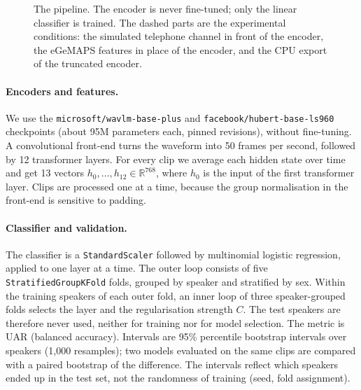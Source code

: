 \documentclass[11pt,a4paper]{article}
\begin{document}
\begin{figure}[t]
\caption{The pipeline. The encoder is never fine-tuned; only the linear classifier is trained.
The dashed parts are the experimental conditions: the simulated telephone channel in front of
the encoder, the eGeMAPS features in place of the encoder, and the CPU export of the truncated
encoder.}
\label{fig:pipeline}
\end{figure}

\paragraph{Encoders and features.} We use the \texttt{microsoft/wavlm-base-plus} and
\texttt{facebook/hubert-base-ls960} checkpoints (about 95M parameters each, pinned revisions),
without fine-tuning. A convolutional front-end turns the waveform into 50 frames per second,
followed by 12 transformer layers. For every clip we average each hidden state over time and
get 13 vectors $h_0,\dots,h_{12}\in\mathbb{R}^{768}$, where $h_0$ is the input of the first
transformer layer. Clips are processed one at a time, because the group normalisation in the
front-end is sensitive to padding.

\paragraph{Classifier and validation.} The classifier is a \texttt{StandardScaler} followed by
multinomial logistic regression, applied to one layer at a time. The outer loop consists of five
\texttt{StratifiedGroupKFold} folds, grouped by speaker and stratified by sex. Within the
training speakers of each outer fold, an inner loop of three speaker-grouped folds selects the
layer and the regularisation strength $C$. The test speakers are therefore never used, neither
for training nor for model selection. The metric is UAR (balanced accuracy). Intervals are 95\%
percentile bootstrap intervals over speakers (1{,}000 resamples); two models evaluated on the
same clips are compared with a paired bootstrap of the difference. The intervals reflect which
speakers ended up in the test set, not the randomness of training (seed, fold assignment).
\end{document}
